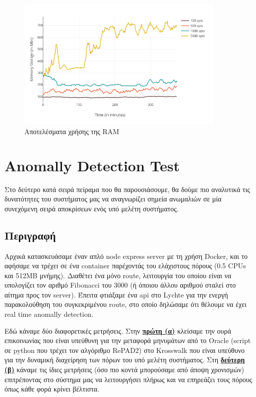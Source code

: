 \begin{figure}[H]
	\centering
	\includegraphics[width=0.9\textwidth]{./images/chapter5/memory-plot.png}
	\caption[Αποτελέσματα χρήσης της RAM]{Αποτελέσματα χρήσης της RAM}
	\label{fig:ram_usage}
\end{figure}

\clearpage

\section{Anomally Detection Test}
\label{subsection:anomally-detection-test}

Στο δεύτερο κατά σειρά πείραμα που θα παρουσιάσουμε, θα δούμε πιο αναλυτικά τις δυνατότητες του συστήματος μας να αναγνωρίζει σημεία ανωμαλιών σε μία συνεχόμενη σειρά αποκρίσεων ενός υπό μελέτη συστήματος.

\subsection{Περιγραφή}

Αρχικά κατασκευάσαμε έναν απλό node express server με τη χρήση Docker, και το αφήσαμε να τρέχει σε ένα container παρέχοντάς του ελάχιστους πόρους (0.5 CPUs και 512MB μνήμης). Διαθέτει ένα μόνο route, λειτουργία του οποίου είναι να υπολογίζει τον αριθμό Fibonacci του 3000 (ή όποιου άλλου αριθμού σταλεί στο αίτημα προς τον server). Έπειτα φτιάξαμε ένα api στο Lychte για την ενεργή παρακολούθηση του συγκεκριμένου route, στο οποίο δηλώσαμε ότι θέλουμε να έχει real time anomally detection.

Εδώ κάναμε δύο διαφορετικές μετρήσεις. Στην \underline{\textbf{πρώτη (α)}} κλείσαμε την ουρά επικοινωνίας που είναι υπεύθυνη για την μεταφορά μηνυμάτων από το Oracle (script σε python που τρέχει τον αλγόριθμο RePAD2) στο Krosswalk που είναι υπεύθυνο για την δυναμική διαχείρηση των πόρων του υπό μελέτη συστήματος. Στη \underline{\textbf{δεύτερη (β)}} κάναμε τις ίδιες μετρήσεις (όσο πιο κοντά μπορούσαμε από άποψη χρονισμών) επιτρέποντας στο σύστημα μας να λειτουργήσει πλήρως και να επηρεάζει τους πόρους όπως κάθε φορά κρίνει βέλτιστα.

